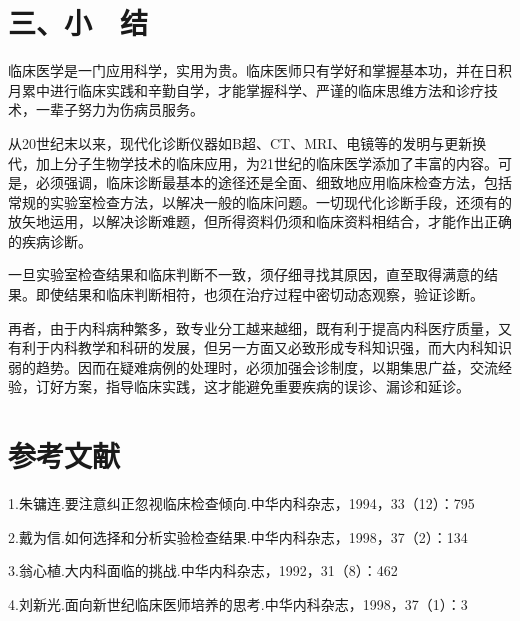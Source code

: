 \section{三、小　结}

临床医学是一门应用科学，实用为贵。临床医师只有学好和掌握基本功，并在日积月累中进行临床实践和辛勤自学，才能掌握科学、严谨的临床思维方法和诊疗技术，一辈子努力为伤病员服务。

从20世纪末以来，现代化诊断仪器如B超、CT、MRI、电镜等的发明与更新换代，加上分子生物学技术的临床应用，为21世纪的临床医学添加了丰富的内容。可是，必须强调，临床诊断最基本的途径还是全面、细致地应用临床检查方法，包括常规的实验室检查方法，以解决一般的临床问题。一切现代化诊断手段，还须有的放矢地运用，以解决诊断难题，但所得资料仍须和临床资料相结合，才能作出正确的疾病诊断。

一旦实验室检查结果和临床判断不一致，须仔细寻找其原因，直至取得满意的结果。即使结果和临床判断相符，也须在治疗过程中密切动态观察，验证诊断。

再者，由于内科病种繁多，致专业分工越来越细，既有利于提高内科医疗质量，又有利于内科教学和科研的发展，但另一方面又必致形成专科知识强，而大内科知识弱的趋势。因而在疑难病例的处理时，必须加强会诊制度，以期集思广益，交流经验，订好方案，指导临床实践，这才能避免重要疾病的误诊、漏诊和延诊。


\section{参考文献}

1.朱镛连.要注意纠正忽视临床检查倾向.中华内科杂志，1994，33（12）：795

2.戴为信.如何选择和分析实验检查结果.中华内科杂志，1998，37（2）：134

3.翁心植.大内科面临的挑战.中华内科杂志，1992，31（8）：462

4.刘新光.面向新世纪临床医师培养的思考.中华内科杂志，1998，37（1）：3


